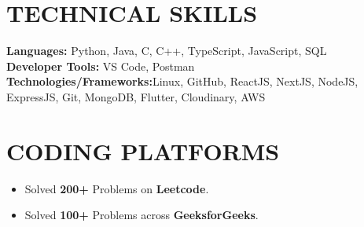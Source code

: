 \documentclass[letterpaper,11pt]{article}
\newcommand{\resumeItem}[1]{
  \item\small{
    {#1 \vspace{-2pt}}
  }
}
\newcommand{\resumeSubHeadingListStart}{\begin{itemize}[leftmargin=0.0in, label={}]}
\newcommand{\resumeSubHeadingListEnd}{\end{itemize}}
\newcommand{\resumeItemListStart}{\begin{itemize}}
\newcommand{\resumeItemListEnd}{\end{itemize}\vspace{-5pt}}
\begin{document}
\section{TECHNICAL SKILLS}
 \begin{itemize}[leftmargin=0.15in, label={}]
    \small{\item{
     \textbf{\normalsize{Languages:}}{ \normalsize{Python, Java, C, C++, TypeScript, JavaScript, SQL}} \\
     \textbf{\normalsize{Developer Tools:}}{ \normalsize{VS Code, Postman}} \\
     \textbf{\normalsize{Technologies/Frameworks:}}{\normalsize{Linux, GitHub, ReactJS, NextJS, NodeJS, ExpressJS, Git, MongoDB, Flutter, Cloudinary, AWS}} \\
    }}
 \end{itemize}
 \vspace{-15pt}
 
\section{CODING PLATFORMS}
    \resumeSubHeadingListStart
        \resumeItemListStart
            \resumeItem{\normalsize{Solved \textbf{200+} Problems on \textbf{Leetcode}.
            \href{https://leetcode.com/u/Shuvam234/}{\raisebox{-0.1\height}\faExternalLink }}}
            \resumeItem{\normalsize{Solved \textbf{100+} Problems across \textbf{GeeksforGeeks}.
            \href{https://www.geeksforgeeks.org/user/shuvamghb21h/}{\raisebox{-0.1\height}\faExternalLink }}}
        \resumeItemListEnd
    \resumeSubHeadingListEnd
 \vspace{-11pt}




\end{document}
